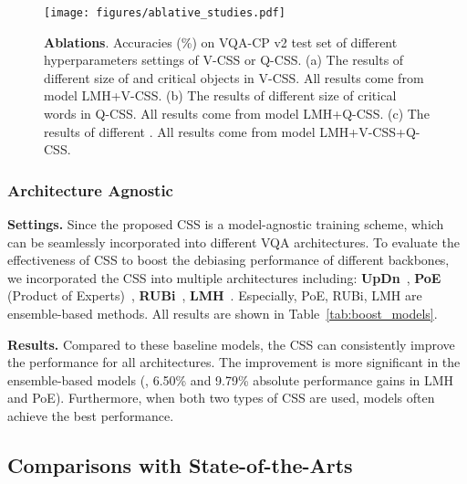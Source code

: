 \documentclass[10pt,twocolumn,letterpaper]{article}
\begin{document}
\begin{figure*}[htbp]
	\centering
	\texttt{[image: figures/ablative\_studies.pdf]}
	\vspace{-0.8em}
	\caption{\textbf{Ablations}. Accuracies (\%) on VQA-CP v2 test set of different hyperparameters settings of V-CSS or Q-CSS. (a) The results of different size of  and critical objects in V-CSS. All results come from model LMH+V-CSS. (b) The results of different size of critical words in Q-CSS. All results come from model LMH+Q-CSS. (c) The results of different . All results come from model LMH+V-CSS+Q-CSS. }
	\label{fig:4}
\end{figure*}


\subsubsection{Architecture Agnostic}

\noindent\textbf{Settings.} Since the proposed CSS is a model-agnostic training scheme, which can be seamlessly incorporated into different VQA architectures. To evaluate the effectiveness of CSS to boost the debiasing performance of different backbones, we incorporated the  CSS into multiple architectures including: \textbf{UpDn}~\cite{anderson2018bottom}, \textbf{PoE} (Product of Experts)~\cite{clark2019don, mahabadi2019simple}, \textbf{RUBi}~\cite{cadene2019rubi}, \textbf{LMH}~\cite{clark2019don}. Especially, PoE, RUBi, LMH are ensemble-based methods. All results are shown in Table~\ref{tab:boost_models}.

\noindent\textbf{Results.} Compared to these baseline models, the CSS can consistently improve the performance for all architectures. The improvement is more significant in the ensemble-based models (\eg, 6.50\% and 9.79\% absolute performance gains in LMH and PoE). Furthermore, when both two types of CSS are used, models often achieve the best performance.


\subsection{Comparisons with State-of-the-Arts}
\end{document}
